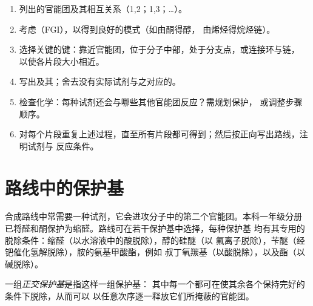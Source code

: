 \begin{method}[逆合成分析]\label{met:b2:retrosynthesis:retrosynthesis}
\begin{enumerate}
  \item 列出的官能团及其相互关系（1,2；1,3；\dots）。
  \item 考虑（FGI），以得到良好的模式（如由酮得醇，
        由烯烃得烷烃链）。
  \item 选择关键的键：靠近官能团，位于分子中部，处于分支点，或连接环与链，
        以使各片段大小相近。
  \item 写出及其；舍去没有实际试剂与之对应的。
  \item 检查化学：每种试剂还会与哪些其他官能团反应？需规划保护，
        或调整步骤顺序。
  \item 对每个片段重复上述过程，直至所有片段都可得到；然后按正向写出路线，注明试剂与
        反应条件。
\end{enumerate}
\end{method}

\section{路线中的保护基}

合成路线中常需要一种试剂，它会进攻分子中的第二个官能团。本科一年级分册
已将醛和酮保护为缩醛。路线可在若干保护基中选择，每种保护基
均有其专用的脱除条件：缩醛（以水溶液中的酸脱除），醇的硅醚（以
氟离子脱除），苄醚（经钯催化氢解脱除），胺的氨基甲酸酯，例如
叔丁氧羰基（以酸脱除），以及酯（以碱脱除）。

\begin{definition}[正交保护]\label{def:b2:retrosynthesis:orthogonal}
一组\emph{正交保护基}是指这样一组保护基：
其中每一个都可在使其余各个保持完好的条件下脱除，从而可以
以任意次序逐一释放它们所掩蔽的官能团。
\end{definition}

